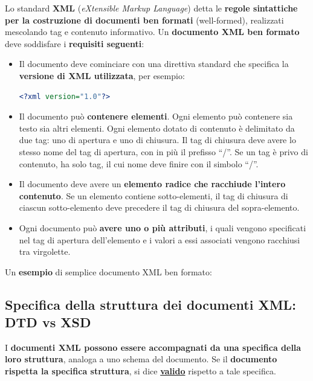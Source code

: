 \documentclass[a4paper]{article}
\newcommand{\dquotes}[1]{``#1''}
\begin{document}
	Lo standard \textcolor{Red3}{\textbf{XML}} (\emph{eXtensible Markup Language}) detta le \textbf{regole sintattiche per la costruzione di documenti ben formati} (well-formed), realizzati mescolando tag e contenuto informativo. Un \textbf{documento XML ben formato} deve soddisfare i \textbf{requisiti seguenti}:
	\begin{itemize}
		\item Il documento deve cominciare con una direttiva standard che specifica la \textbf{versione di XML utilizzata}, per esempio:
		\begin{lstlisting}[language=XML]
<?xml version="1.0"?>\end{lstlisting}
		
		\item Il documento può \textbf{contenere elementi}. Ogni elemento può contenere sia testo sia altri elementi. Ogni elemento dotato di contenuto è delimitato da due tag: uno di apertura e uno di chiusura. Il tag di chiusura deve avere lo stesso nome del tag di apertura, con in più il prefisso \dquotes{/}. Se un tag è privo di contenuto, ha solo tag, il cui nome deve finire con il simbolo \dquotes{/}.
		
		\item Il documento deve avere un \textbf{elemento radice che racchiude l'intero contenuto}. Se un elemento contiene sotto-elementi, il tag di chiusura di ciascun sotto-elemento deve precedere il tag di chiusura del sopra-elemento.
		
		\item Ogni documento può \textbf{avere uno o più attributi}, i quali vengono specificati nel tag di apertura dell'elemento e i valori a essi associati vengono racchiusi tra virgolette.
	\end{itemize}
	Un \textcolor{Green4}{\textbf{esempio}} di semplice documento XML ben formato:
	\newpage
	
	\subsection{Specifica della struttura dei documenti XML: DTD vs XSD}
	
	I \textbf{documenti XML possono essere accompagnati da una specifica della loro struttura}, analoga a uno schema del documento. Se il \textbf{documento rispetta la specifica struttura}, si dice \underline{\textbf{valido}} rispetto a tale specifica.\newline
	
\end{document}
